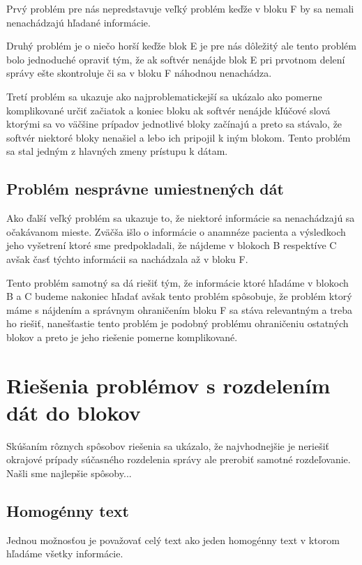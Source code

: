 Prvý problém pre nás nepredstavuje veľký problém keďže v bloku F by sa nemali nenachádzajú hľadané informácie. 

Druhý problém je o niečo horší keďže blok E je pre nás dôležitý ale tento problém bolo jednoduché opraviť tým, že ak softvér nenájde blok E pri prvotnom delení správy ešte skontroluje či sa v bloku F náhodnou nenachádza.

Tretí problém sa ukazuje ako najproblematickejší sa ukázalo ako pomerne komplikované určiť začiatok a koniec bloku ak softvér nenájde kľúčové slová ktorými sa vo väčšine prípadov jednotlivé bloky začínajú a preto sa stávalo, že softvér niektoré bloky nenašiel a lebo ich pripojil k iným blokom. Tento problém sa stal jedným z hlavných zmeny prístupu k dátam.

\subsection{Problém nesprávne umiestnených dát}

Ako ďalší veľký problém sa ukazuje to, že niektoré informácie sa nenachádzajú sa očakávanom mieste. Zväčša išlo o informácie o anamnéze pacienta a výsledkoch jeho vyšetrení ktoré sme predpokladali, že nájdeme v blokoch B respektíve C avšak časť týchto informácii sa nachádzala až v bloku F.

Tento problém samotný sa dá riešiť tým, že informácie ktoré hľadáme v blokoch B a C budeme nakoniec hľadať avšak tento problém spôsobuje, že problém ktorý máme s nájdením a správnym ohraničením bloku F sa stáva relevantným a treba ho riešiť, nanešťastie tento problém je podobný problému ohraničeniu ostatných blokov a preto je jeho riešenie pomerne komplikované.

\section{Riešenia problémov s rozdelením dát do blokov}

Skúšaním rôznych spôsobov riešenia sa ukázalo, že najvhodnejšie je neriešiť okrajové prípady súčasného rozdelenia správy ale prerobiť samotné rozdeľovanie. {Našli sme najlepšie spôsoby...}

\subsection{Homogénny text}

Jednou možnosťou je považovať celý text ako jeden homogénny text v ktorom hľadáme všetky informácie.

